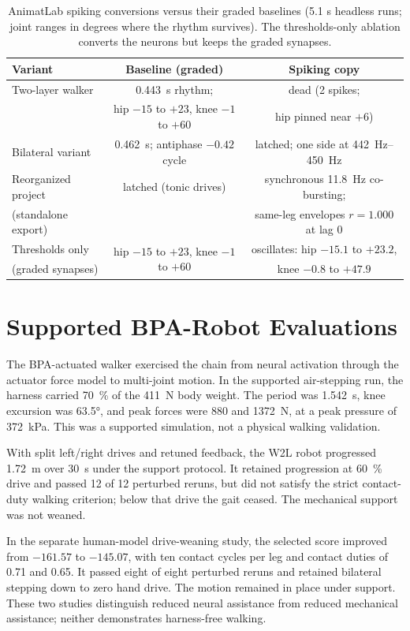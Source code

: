 \begin{table}[htbp]
\caption{AnimatLab spiking conversions versus their graded baselines (5.1 s headless runs; joint ranges in degrees where the rhythm survives). The thresholds-only ablation converts the neurons but keeps the graded synapses.}
\label{tab:spike_animatlab}
\small
\begin{tabular}{@{}lcc@{}}
\toprule
\textbf{Variant} & \textbf{Baseline (graded)} & \textbf{Spiking copy} \\
\midrule
Two-layer walker     & \qty{0.443}{\second} rhythm;   & dead (2 spikes; \\
                     & hip $-15$ to $+23$, knee $-1$ to $+60$ & hip pinned near $+6$) \\
Bilateral variant    & \qty{0.462}{\second}; antiphase $-0.42$ cycle & latched; one side at \qty{442}{\hertz}--\qty{450}{\hertz} \\
Reorganized project  & latched (tonic drives) & synchronous \qty{11.8}{\hertz} co-bursting; \\
(standalone export)  &                        & same-leg envelopes $r = 1.000$ at lag 0 \\
Thresholds only      & \multirow{2}{*}{hip $-15$ to $+23$, knee $-1$ to $+60$} & oscillates: hip $-15.1$ to $+23.2$, \\
(graded synapses)    &                        & knee $-0.8$ to $+47.9$ \\
\bottomrule
\end{tabular}
\end{table}

\section{Supported BPA-Robot Evaluations}\label{sec:sns_controller_comparison}

The BPA-actuated walker exercised the chain from neural activation through the actuator force model to multi-joint motion. In the supported air-stepping run, the harness carried \qty{70}{\percent} of the \qty{411}{\newton} body weight. The period was \qty{1.542}{\second}, knee excursion was \ang{63.5}, and peak forces were \qty{880}{} and \qty{1372}{\newton}, at a peak pressure of \qty{372}{\kPa}. This was a supported simulation, not a physical walking validation.

With split left/right drives and retuned feedback, the W2L robot progressed \qty{1.72}{\meter} over \qty{30}{\second} under the support protocol. It retained progression at \qty{60}{\percent} drive and passed 12 of 12 perturbed reruns, but did not satisfy the strict contact-duty walking criterion; below that drive the gait ceased. The mechanical support was not weaned.

In the separate human-model drive-weaning study, the selected score improved from $-161.57$ to $-145.07$, with ten contact cycles per leg and contact duties of 0.71 and 0.65. It passed eight of eight perturbed reruns and retained bilateral stepping down to zero hand drive. The motion remained in place under support. These two studies distinguish reduced neural assistance from reduced mechanical assistance; neither demonstrates harness-free walking.
